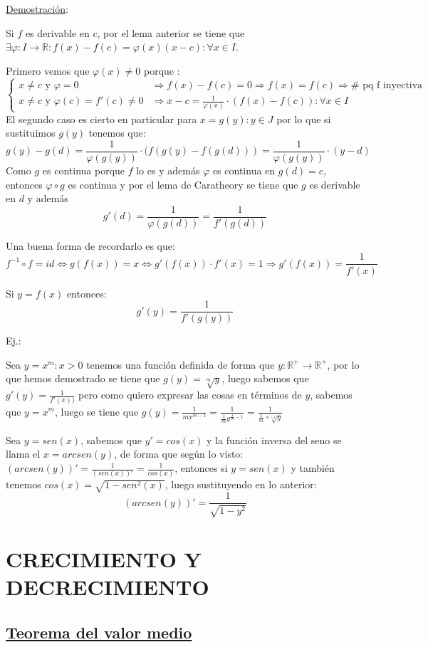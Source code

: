 \documentclass[10pt,a4paper,openright]{book}
\begin{document}
\underline{Demostración}:

Si $f$ es derivable en $c$, por el lema anterior se tiene que $\exists \varphi: I \rightarrow\mathbb R: f(x)-f(c)=\varphi(x)(x-c): \forall x\in I$.

Primero vemos que $\varphi (x)\neq 0$ porque :
$$\begin{cases}x\neq c \mbox{ y } \varphi =0 & \Rightarrow f(x)-f(c)=0\Rightarrow f(x)=f(c)\Rightarrow \# \mbox{ pq f inyectiva}\\
x\neq c \mbox{ y } \varphi(c)= f'(c)\neq 0 &\Rightarrow x-c=\frac{1}{\varphi(x)}\cdot (f(x)-f(c)): \forall x\in I
\end{cases}$$
El segundo caso es cierto en particular para $x=g(y): y\in J$ por lo que si sustituimos $g(y)$ tenemos que:
$$g(y)-g(d)=\frac{1}{\varphi(g(y))}\cdot (f(g(y)-f(g(d)))=\frac{1}{\varphi(g(y))}\cdot (y-d)$$
Como $g$ es continua porque $f$ lo es y además $\varphi$ es continua en $g(d)=c$, entonces $\varphi\circ g$ es continua y por el lema de Caratheory se tiene que $g$ es derivable en $d$ y además
$$g'(d)=\frac{1}{\varphi(g(d))}=\frac{1}{f'(g(d))}$$

Una buena forma de recordarlo es que:
$$f^{-1}\circ f = id \Leftrightarrow g(f(x))=x\Leftrightarrow g'(f(x))\cdot f'(x)=1\Rightarrow g'(f(x))=\frac{1}{f'(x)}$$

Si $y=f(x)$ entonces:
$$g'(y)=\frac{1}{f'(g(y))}$$

Ej.:

Sea $y=x^m: x>0$ tenemos una función definida de forma que $y: \mathbb R^+ \rightarrow \mathbb R^+$, por lo que hemos demostrado se tiene que $g(y)=\sqrt[m]{y}$, luego sabemos que $g'(y)=\frac{1}{f'(x))}$ pero como quiero expresar las cosas en términos de $y$, sabemos que $y=x^m$, luego se tiene que $g(y)=\frac{1}{mx^{m-1}}=\frac{1}{\frac{1}{m}y^{\frac{1}{m}-1}}=\frac{1}{\frac{1}{m}\sqrt[m-1]{y}}$

Sea $y=sen(x)$, sabemos que $y'=cos(x)$ y la función inversa del seno se llama el $x=arcsen(y)$, de forma que según lo visto: $(arcsen(y))'=\frac{1}{(sen(x))'}=\frac{1}{cos(x)}$, entonces si $y=sen(x)$ y también tenemos $cos(x)=\sqrt{1-sen^2(x)}$, luego sustituyendo en lo anterior:
$$(arcsen(y))'=\frac{1}{\sqrt{1-y^2}}$$

\section*{CRECIMIENTO Y DECRECIMIENTO}
\subsection*{\underline{Teorema del valor medio}}
\end{document}
